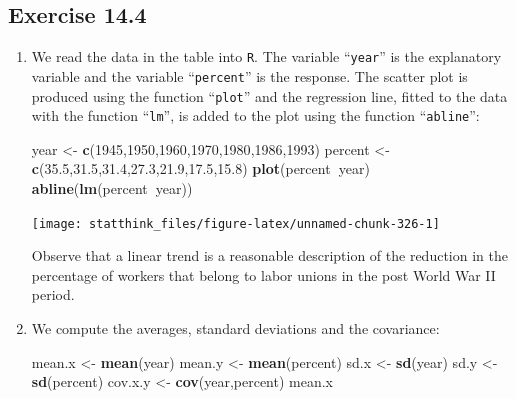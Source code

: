 \documentclass[]{krantz}
\makeatletter
\newenvironment{Shaded}{\begin{snugshade}}{\end{snugshade}}
\newcommand{\DecValTok}[1]{\textcolor[rgb]{0.00,0.00,0.81}{#1}}
\newcommand{\FloatTok}[1]{\textcolor[rgb]{0.00,0.00,0.81}{#1}}
\newcommand{\KeywordTok}[1]{\textcolor[rgb]{0.13,0.29,0.53}{\textbf{#1}}}
\newcommand{\NormalTok}[1]{#1}
\newcommand{\OperatorTok}[1]{\textcolor[rgb]{0.81,0.36,0.00}{\textbf{#1}}}
\newcommand{\StringTok}[1]{\textcolor[rgb]{0.31,0.60,0.02}{#1}}
\newenvironment{kframe}{%
\medskip{}
\setlength{\fboxsep}{.8em}
 \def\at@end@of@kframe{}%
 \ifinner\ifhmode%
  \def\at@end@of@kframe{\end{minipage}}%
  \begin{minipage}{\columnwidth}%
 \fi\fi%
 \def\FrameCommand##1{\hskip\@totalleftmargin \hskip-\fboxsep
 \colorbox{shadecolor}{##1}\hskip-\fboxsep
     \hskip-\linewidth \hskip-\@totalleftmargin \hskip\columnwidth}%
 \MakeFramed {\advance\hsize-\width
   \@totalleftmargin\z@ \linewidth\hsize
   \@setminipage}}%
 {\par\unskip\endMakeFramed%
 \at@end@of@kframe}
\renewenvironment{Shaded}{\begin{kframe}}{\end{kframe}}
\theoremstyle{definition}
\theoremstyle{definition}
\theoremstyle{definition}
\theoremstyle{remark}
\makeatother
\begin{document}
\hypertarget{exercise-14.4}{%
\subsection*{Exercise 14.4}\label{exercise-14.4}}


\begin{enumerate}
\def\labelenumi{\arabic{enumi}.}
\item
  We read the data in the table into
  \texttt{R}. The variable ``\texttt{year}'' is the explanatory variable and the variable
  ``\texttt{percent}'' is the response. The scatter plot is produced using the
  function ``\texttt{plot}'' and the regression line, fitted to the data with the
  function ``\texttt{lm}'', is added to the plot using the function ``\texttt{abline}'':

\begin{Shaded}
\begin{Highlighting}[]
\NormalTok{year <-}\StringTok{ }\KeywordTok{c}\NormalTok{(}\DecValTok{1945}\NormalTok{,}\DecValTok{1950}\NormalTok{,}\DecValTok{1960}\NormalTok{,}\DecValTok{1970}\NormalTok{,}\DecValTok{1980}\NormalTok{,}\DecValTok{1986}\NormalTok{,}\DecValTok{1993}\NormalTok{)}
\NormalTok{percent <-}\StringTok{ }\KeywordTok{c}\NormalTok{(}\FloatTok{35.5}\NormalTok{,}\FloatTok{31.5}\NormalTok{,}\FloatTok{31.4}\NormalTok{,}\FloatTok{27.3}\NormalTok{,}\FloatTok{21.9}\NormalTok{,}\FloatTok{17.5}\NormalTok{,}\FloatTok{15.8}\NormalTok{)}
\KeywordTok{plot}\NormalTok{(percent}\OperatorTok{~}\NormalTok{year)}
\KeywordTok{abline}\NormalTok{(}\KeywordTok{lm}\NormalTok{(percent}\OperatorTok{~}\NormalTok{year))}
\end{Highlighting}
\end{Shaded}

  \begin{center}\texttt{[image: statthink\_files/figure-latex/unnamed-chunk-326-1]} \end{center}

  Observe that a linear trend is a
  reasonable description of the reduction in the percentage of workers
  that belong to labor unions in the post World War II period.
\item
  We compute the averages, standard
  deviations and the covariance:

\begin{Shaded}
\begin{Highlighting}[]
\NormalTok{mean.x <-}\StringTok{ }\KeywordTok{mean}\NormalTok{(year)}
\NormalTok{mean.y <-}\StringTok{ }\KeywordTok{mean}\NormalTok{(percent)}
\NormalTok{sd.x <-}\StringTok{ }\KeywordTok{sd}\NormalTok{(year)}
\NormalTok{sd.y <-}\StringTok{ }\KeywordTok{sd}\NormalTok{(percent)}
\NormalTok{cov.x.y <-}\StringTok{ }\KeywordTok{cov}\NormalTok{(year,percent)}
\NormalTok{mean.x}
\end{Highlighting}
\end{Shaded}


\end{enumerate}
\end{document}
